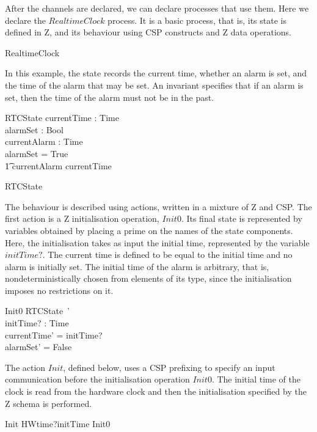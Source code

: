 \documentclass[a4paper,10pt]{report}
\begin{document}
%
After the channels are declared, we can declare processes that use them. Here we
declare the $RealtimeClock$ process. It is a basic process, that is, its state
is defined in Z, and its behaviour using CSP constructs and Z data operations.
%
\begin{circus}
  \circprocess RealtimeClock \circdef \circbegin
\end{circus}
%
In this example, the state records the current time, whether an alarm is set,
and the time of the alarm that may be set. An invariant specifies that if an
alarm is set, then the time of the alarm must not be in the past.
%
\begin{schema}{RTCState}
  currentTime  : Time \\
  alarmSet     : Bool \\
  currentAlarm : Time \\
\where
  alarmSet = True \implies \\
  \t1 currentAlarm \geq currentTime
\end{schema}
\begin{circusaction}
  \circstate RTCState
\end{circusaction}
%
The behaviour is described using actions, written in a mixture of Z and CSP. The
first action is a Z initialisation operation, $Init0$.  Its final state is
represented by variables obtained by placing a prime on the names of the state
components.  Here, the initialisation takes as input the initial time,
represented by the variable $initTime?$. The current time is defined to be equal
to the initial time and no alarm is initially set. The initial time of the alarm
is arbitrary, that is, nondeterministically chosen from elements of its type,
since the initialisation imposes no restrictions on it.
%
\begin{schema}{Init0}
  RTCState~' \\
  initTime? : Time \\
\where
  currentTime' = initTime? \\
  alarmSet' = False \\
\end{schema}
%
The action $Init$, defined below, uses a CSP prefixing to specify an input
communication before the initialisation operation $Init0$.  The initial time of
the clock is read from the hardware clock and then the initialisation specified
by the Z schema is performed.
%
\begin{circusaction}
  Init \circdef HWtime?initTime \then Init0
\end{circusaction}
\end{document}
